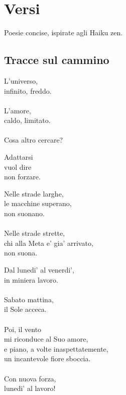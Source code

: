 \chapter{Versi}

Poesie concise, ispirate agli Haiku zen.\\

\vfill

\section{Tracce sul cammino}

\begin{haiku}
L'universo,\\
infinito, freddo.\\
\leavevmode\\
L'amore,\\
caldo, limitato.\\
\leavevmode\\
Cosa altro cercare?\\
\end{haiku}


\begin{haiku}
Adattarsi \\
vuol dire\\
non forzare.\\
\end{haiku}

\begin{haiku}
Nelle strade larghe,\\
le macchine superano,\\
non suonano.\\
\leavevmode\\
Nelle strade strette,\\
chi alla Meta e' gia' arrivato,\\
non suona.\\
\end{haiku}

\begin{haiku}
Dal lunedi' al venerdi',\\
in miniera lavoro.\\
\leavevmode\\
Sabato mattina,\\
il Sole acceca.\\
\leavevmode\\
Poi, il vento\\
mi riconduce al Suo amore,\\
e piano, a volte inaspettatemente,\\
un incantevole fiore sboccia.\\
\leavevmode\\
Con nuova forza,\\
lunedi' al lavoro!\\
\end{haiku}

